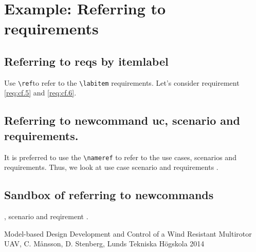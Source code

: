 \documentclass[a4paper]{article}
\makeatletter
\newcommand{\labitem}[2]{%
\def\@itemlabel{\textbf{#2}}
\item
\def\@currentlabel{#2}\label{#1}}
\makeatother
\begin{document}
\section{Example: Referring to requirements}
\subsection{Referring to reqs by itemlabel}
Use \verb!\ref!to refer to the \verb!\labitem! requirements. Let's consider requirement \ref{req:cf.5} and \ref{req:cf.6}.

\subsection{Referring to newcommand uc, scenario and requirements.}
It is preferred to use the \verb!\nameref! to refer to the use cases, scenarios and requirements.
Thus, we look at use case  scenario  and requirements .

\subsection{Sandbox of referring to newcommands}
, scenario  and reqirement .


\begin{thebibliography}{99}
 Model-based Design Development and Control of a Wind Resistant Multirotor UAV, C. Månsson, D. Stenberg, Lunds Tekniska Högskola 2014
\end{thebibliography}
\end{document}
